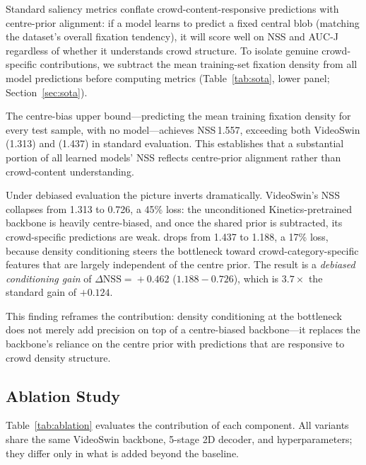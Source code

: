 \documentclass[twocolumn]{article}
\begin{document}
Standard saliency metrics conflate crowd-content-responsive predictions with
centre-prior alignment: if a model learns to predict a fixed central blob
(matching the dataset's overall fixation tendency), it will score well on
NSS and AUC-J regardless of whether it understands crowd structure.
To isolate genuine crowd-specific contributions, we subtract the mean
training-set fixation density from all model predictions before computing
metrics (Table~\ref{tab:sota}, lower panel; Section~\ref{sec:sota}).

The centre-bias upper bound---predicting the mean training fixation density
for every test sample, with no model---achieves NSS\,1.557, exceeding both
VideoSwin (1.313) and \ourmodel{} (1.437) in standard evaluation.
This establishes that a substantial portion of all learned models' NSS
reflects centre-prior alignment rather than crowd-content understanding.

Under debiased evaluation the picture inverts dramatically.
VideoSwin's NSS collapses from 1.313 to 0.726, a 45\% loss: the
unconditioned Kinetics-pretrained backbone is heavily centre-biased, and
once the shared prior is subtracted, its crowd-specific predictions are weak.
\ourmodel{} drops from 1.437 to 1.188, a 17\% loss, because density
conditioning steers the bottleneck toward crowd-category-specific features
that are largely independent of the centre prior.
The result is a \emph{debiased conditioning gain} of
$\Delta\mathrm{NSS}\!=\!+0.462$ ($1.188 - 0.726$), which is
$3.7\!\times$ the standard gain of $+0.124$.

This finding reframes the contribution: density conditioning at the
bottleneck does not merely add precision on top of a centre-biased
backbone---it replaces the backbone's reliance on the centre prior with
predictions that are responsive to crowd density structure.

\subsection{Ablation Study}
\label{sec:ablation}

Table~\ref{tab:ablation} evaluates the contribution of each component.
All variants share the same VideoSwin backbone, 5-stage 2D decoder, and
hyperparameters; they differ only in what is added beyond the baseline.
\end{document}
